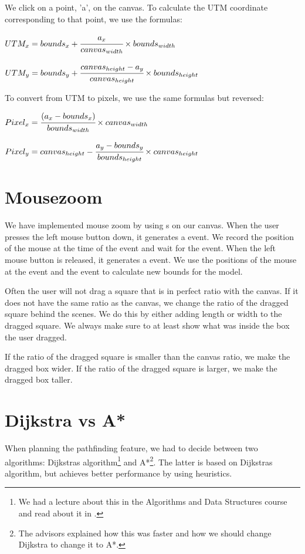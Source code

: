 We click on a point, 'a', on the canvas. To calculate the UTM coordinate
corresponding to that point, we use the formulas:

\begin{center}
$
UTM_x = bounds_x + \cfrac{a_x}{canvas_{width}} \times bounds_{width}
$
\end{center}

\begin{center}
$
UTM_y = bounds_y + \cfrac{canvas_{height} - a_y}{canvas_{height}} \times
bounds_{height}
$
\end{center}

To convert from UTM to pixels, we use the same formulas but reversed:

\begin{center} 
$
Pixel_x = \cfrac{(a_x - bounds_x)}{bounds_{width}} \times
canvas_{width}
$
\end{center}

\begin{center}
$
Pixel_y = canvas_{height} - \cfrac{a_y - bounds_y}{bounds_{height}} \times
canvas_{height}
$
\end{center}

\section{Mousezoom}
\label{IMPL-MZ}
We have implemented mouse zoom by using s on
our canvas. When the user presses the left mouse button down, it generates a
 event. We record the position of the mouse at the time of
the  event and wait for the  event.
When the left mouse button is released, it generates a 
event. We use the positions of the mouse at the  event and
the  event to calculate new bounds for the model.

Often the user will not drag a square that is in perfect ratio with the
canvas. If it does not have the same ratio as the canvas, we change the ratio
of the dragged square behind the scenes. We do this by either adding length or
width to the dragged square. We always make sure to at least show what was
inside the box the user dragged.

If the ratio of the dragged square is smaller than the canvas ratio, we make the
dragged box wider. If the ratio of the dragged square is larger, we make the
dragged box taller.

\section{Dijkstra vs A*}
\label{IMPL-DVA}
When planning the pathfinding feature, we had to decide between two algorithms:
Dijkstras algorithm\footnote{We had a lecture about this in the Algorithms and
Data Structures course and read about it in \cite[p.~???]{algs4}.} and
A*\footnote{The advisors explained how this was faster and how we should
change Dijkstra to change it to A*.}. The latter is based on Dijkstras
algorithm, but achieves better performance by using heuristics.

